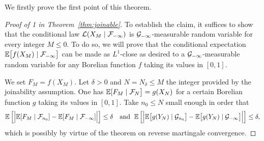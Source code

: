 \documentclass[12pt,a4paper]{article}
\begin{document}
We firstly prove the first point of this theorem. 

\begin{proof}[Proof of 1 in Theorem~\ref{thm:joinable}]
To establish the claim, it suffices to show that 
the conditional law $\mathcal{L}(X_M \mid \mathcal{F}_{-\infty})$ is 
$\mathcal{G}_{-\infty}$-measurable random variable for every integer $M \leq 0$. 
To do so, we will prove that the conditional expectation 
$\mathbb{E}\bigl[f(X_{M}) \mid \mathcal{F}_{-\infty}\bigr]$ can be made as $L^1$-close as desired to a 
$\mathcal{G}_{-\infty}$-measurable random variable for any Borelian function $f$ 
taking its values in $[0,1]$. 

We set $F_M=f(X_M)$. Let $\delta>0$ and $N = N_\delta \leq M$ 
the integer provided by the joinability assumption. 
One has 
$\mathbb{E}[F_M \mid \mathcal{F}_{N}\bigr] = g(X_{N})$ 
for a certain Borelian function $g$ taking its values in $[0,1]$. 
Take $n_0 \leq N$ small enough in order that 
$$
\mathbb{E}\left[ \Bigr| 
\mathbb{E}[F_M \mid \mathcal{F}_{n_0}] - \mathbb{E}[F_M \mid \mathcal{F}_{-\infty}] 
\Bigl| \right] 
\leq \delta
\quad \text{and }\; 
\mathbb{E}\left[ \Bigr| 
\mathbb{E}\bigl[g(Y_N) \mid \mathcal{G}_{n_0}\bigr] - \mathbb{E}\bigl[g(Y_N) \mid \mathcal{G}_{-\infty}\bigr]
\Bigl| \right] 
\leq \delta,
$$
which is possibly by virtue of the theorem on reverse martingale convergence. 


\end{proof}
\end{document}
